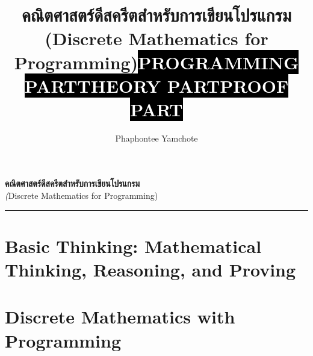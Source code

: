 \documentclass[12pt,twoside,openright]{book}
\title{คณิตศาสตร์ดีสครีตสำหรับการเขียนโปรแกรม\\(Discrete Mathematics for Programming)}
\author{Phaphontee Yamchote}
\date{}
\title{\sffamily\colorbox{black}{\bfseries\textcolor{white}{\Large PROGRAMMING PART}}}
\title{\sffamily\colorbox{black}{\bfseries\textcolor{white}{\Large THEORY PART}}}
\title{\sffamily\colorbox{black}{\bfseries\textcolor{white}{\Large PROOF PART}}}
\theoremstyle{definition}
\begin{document}
\begin{titlepage}
	\raggedleft	
	\hspace{.025\textwidth}
	\parbox[b]{\textwidth}{
		\vspace{1.5cm}
		{\Huge\bfseries คณิตศาสตร์ดีสครีตสำหรับการเขียนโปรแกรม}                \\[20pt] 
		{\Large\textit (Discrete Mathematics for Programming)}
		}
	\vspace{1cm}  
	\vfill
	\rule{1pt}{.15\textheight}
	\hspace{.025\textwidth}
\end{titlepage}
	\frontmatter
	\tableofcontents

	\mainmatter

    
%    
%   
	 
   	\part{Basic Thinking: Mathematical Thinking, Reasoning, and Proving}
   	
   	
%   	
   	
   	
%   	
%   	
   	\part{Discrete Mathematics with Programming}
   	
   	
   	
   	
   	
   	
   	
   	
   	
%   	
	
\end{document}
